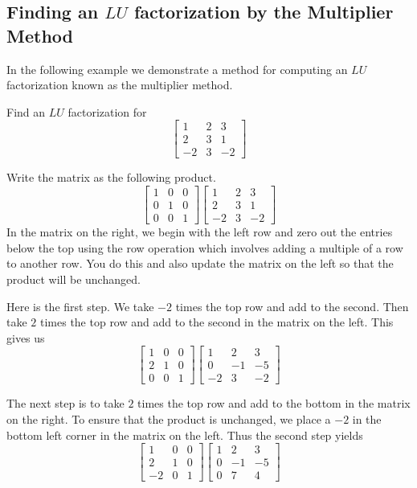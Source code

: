 \documentclass{ximera}
\begin{document}
\subsection*{Finding an $LU$ factorization by the Multiplier Method}

In the following example we demonstrate a method for computing an $LU$ factorization known as the multiplier method.

\begin{example}\label{ex:multiplierLU}
Find an $LU$ factorization for
\[
\begin{bmatrix}
1 & 2 & 3 \\
2 & 3 & 1 \\
-2 & 3 & -2
\end{bmatrix} 
\]

\begin{explanation}
Write the matrix as the following product.
\[
\begin{bmatrix}
1 & 0 & 0 \\
0 & 1 & 0 \\
0 & 0 & 1
\end{bmatrix} 
\begin{bmatrix}
1 & 2 & 3 \\
2 & 3 & 1 \\
-2 & 3 & -2
\end{bmatrix} 
\]
In the matrix on the right, we begin with the left row and zero
out the entries below the top using the row operation which involves adding a multiple of a row to another row. You do this and also update the matrix on the left so that the product will be unchanged. 

Here is the first step.  We take $-2$ times the top row and add to the second. Then take $2$ times the top row and add to the second in the matrix on the left.  This gives us
\[
\begin{bmatrix}
1 & 0 & 0 \\
2 & 1 & 0 \\
0 & 0 & 1
\end{bmatrix} 
\begin{bmatrix}
1 & 2 & 3 \\
0 & -1 & -5 \\
-2 & 3 & -2
\end{bmatrix} 
\]

The next step is to take $2$ times the top row and add to the bottom in the matrix on the right. To ensure that the product is unchanged, we place a $-2$ in the bottom left corner in the matrix on the left. Thus the second step yields
\[
\begin{bmatrix}
1 & 0 & 0 \\
2 & 1 & 0 \\
-2 & 0 & 1
\end{bmatrix} 
\begin{bmatrix}
1 & 2 & 3 \\
0 & -1 & -5 \\
0 & 7 & 4
\end{bmatrix} 
\]


\end{explanation}
\end{example}
\end{document}
